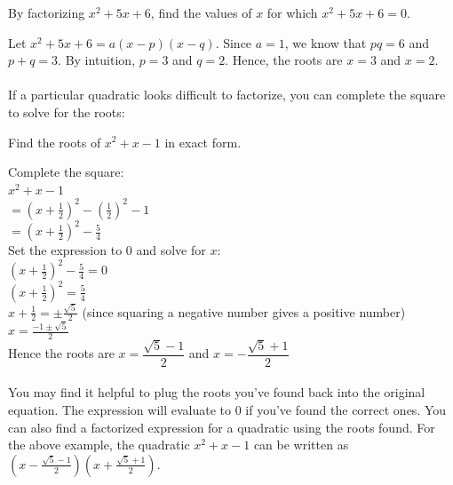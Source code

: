 \documentclass[12pt, a4paper, titlepage, twoside]{article}
\newcounter{excount}[subsection]
\begin{document}
	\begin{ex}
		By factorizing $x^2 + 5x + 6$, find the values of $x$ for which $x^2 + 5x + 6 = 0$.
		
		\hfill
		\tcbline
		\hfill
		
		Let $x^2 + 5x + 6 = a(x-p)(x-q)$. Since $a = 1$, we know that $pq = 6$ and $p+q=3$.
		By intuition, $p = 3$ and $q = 2$. Hence, the roots are $x = 3$ and $x = 2$.
	\end{ex}
	
	\paragraph{}
	If a particular quadratic looks difficult to factorize, you can complete the square to solve for the roots:\\
	
	\stepcounter{excount}
	\begin{ex}
		Find the roots of $x^2 + x - 1$ in exact form.
		
		\hfill
		\tcbline
		\hfill
		
		Complete the square:\\ $x^2 + x - 1$\\ $= (x+\frac{1}{2})^2 - (\frac{1}{2})^2 - 1$\\ $= (x+\frac{1}{2})^2 - \frac{5}{4}$\\
		
		Set the expression to 0 and solve for $x$:\\
		$(x+\frac{1}{2})^2 - \frac{5}{4} = 0$\\
		$(x+\frac{1}{2})^2 = \frac{5}{4}$\\
		$x+\frac{1}{2} = \pm \frac{\sqrt{5}}{2}$ (since squaring a negative number gives a positive number)\\
		$x = \frac{-1 \pm \sqrt{5}}{2}$\\
		
		Hence the roots are $x = \dfrac{\sqrt{5} - 1}{2}$ and $x = -\dfrac{\sqrt{5} + 1}{2}$
	\end{ex}
	
	\paragraph{}
	You may find it helpful to plug the roots you've found back into the original equation. The expression will evaluate to 0 if you've found 
	the correct ones. You can also find a factorized expression for a quadratic using the roots found. For the above example, the quadratic
	$x^2 + x - 1$ can be written as $\left(x-\frac{\sqrt{5} - 1}{2}\right)\left(x+\frac{\sqrt{5} + 1}{2}\right)$.
	
\end{document}
